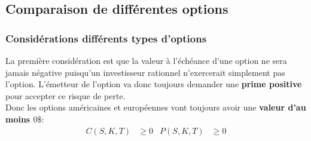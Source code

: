 \documentclass[10pt, french]{article}
\begin{document}
\begin{multicols*}{2}


\columnbreak
\subsection{Comparaison de différentes options}

%
%

\subsubsection*{Considérations différents types d'options}
La première considération est que la valeur à l'échéance d'une option ne sera jamais négative puisqu'un investisseur \og rationnel \fg{} n'exercerait simplement pas l'option. L'émetteur de l'option va donc toujours demander une \textbf{prime positive} pour accepter ce risque de perte.\\

Donc les options américaines et européennes vont toujours avoir une \textbf{valeur d'au moins $0\$$}:
\begin{align*}
	C(S, K, T) &\geq	0	&
	P(S, K, T) &\geq	0	
\end{align*}



\end{multicols*}
\end{document}
